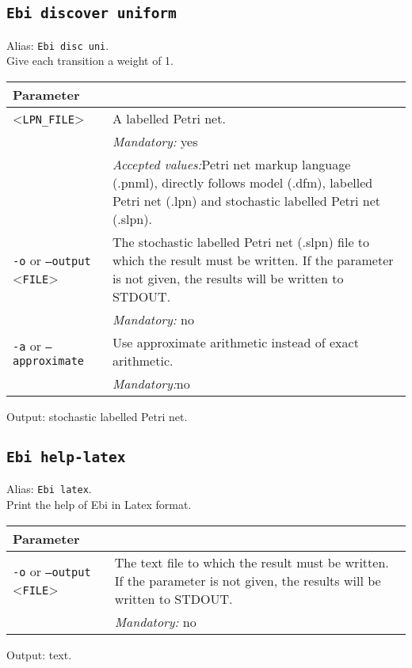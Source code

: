 {\subsection{\texttt{Ebi discover uniform}}
Alias: \texttt{Ebi disc uni}.\\
Give each transition a weight of 1.\\
\begin{tabularx}{\linewidth}{lX}
\toprule
Parameter \\\midrule
<\texttt{LPN\_FILE}>&A labelled Petri net.\\
&\textit{Mandatory:} \quad yes\\
&\textit{Accepted values:}\quad Petri net markup language (.pnml), directly follows model (.dfm), labelled Petri net (.lpn) and stochastic labelled Petri net (.slpn).\\
\texttt{-o} or \texttt{--output} <\texttt{FILE}> &
The stochastic labelled Petri net (.slpn) file to which the result must be written. If the parameter is not given, the results will be written to STDOUT.\\
&\textit{Mandatory:} \quad no\\
\texttt{-a} or \texttt{--approximate} & Use approximate arithmetic instead of exact arithmetic.\\
&\textit{Mandatory:}\quad no\\
\bottomrule
\end{tabularx}
Output: stochastic labelled Petri net.
\subsection{\texttt{Ebi help-latex}}
Alias: \texttt{Ebi latex}.\\
Print the help of Ebi in Latex format.\\
\begin{tabularx}{\linewidth}{lX}
\toprule
Parameter \\\midrule
\texttt{-o} or \texttt{--output} <\texttt{FILE}> &
The text file to which the result must be written. If the parameter is not given, the results will be written to STDOUT.\\
&\textit{Mandatory:} \quad no\\
\bottomrule
\end{tabularx}
Output: text.
}
